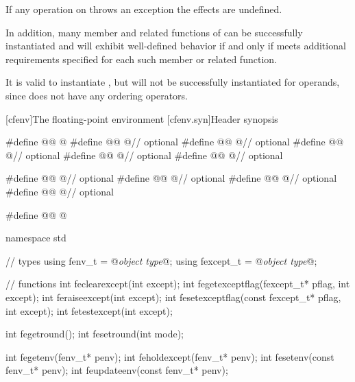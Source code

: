 \pnum
If any operation on 
throws an exception the effects are undefined.

\pnum
In addition, many member and related functions of
can be successfully instantiated
and will exhibit well-defined behavior if and only if
 meets additional requirements specified for each such member
or related function.

\pnum
\begin{example}
It is valid to instantiate
,
but
will not be successfully instantiated for
operands, since
does not have any ordering operators.
\end{example}

[cfenv]{The floating-point environment}
[cfenv.syn]{Header  synopsis}

%
%
%
%
%
%
%
%
%
%
%
%
%
%
\begin{codeblock}
#define @@ @\seebelow@
#define @@ @\seebelow@    // optional
#define @@ @\seebelow@      // optional
#define @@ @\seebelow@      // optional
#define @@ @\seebelow@     // optional
#define @@ @\seebelow@    // optional

#define @@ @\seebelow@     // optional
#define @@ @\seebelow@    // optional
#define @@ @\seebelow@   // optional
#define @@ @\seebelow@       // optional

#define @@ @\seebelow@

namespace std {
  // types
  using fenv_t    = @\textit{object type}@;
  using fexcept_t = @\textit{object type}@;

  // functions
  int feclearexcept(int except);
  int fegetexceptflag(fexcept_t* pflag, int except);
  int feraiseexcept(int except);
  int fesetexceptflag(const fexcept_t* pflag, int except);
  int fetestexcept(int except);

  int fegetround();
  int fesetround(int mode);

  int fegetenv(fenv_t* penv);
  int feholdexcept(fenv_t* penv);
  int fesetenv(const fenv_t* penv);
  int feupdateenv(const fenv_t* penv);
}
\end{codeblock}

